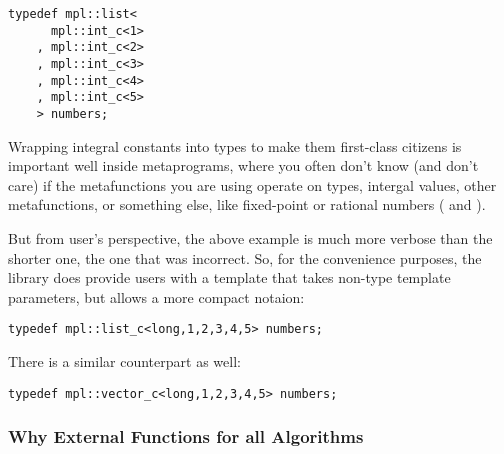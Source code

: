 \documentclass{netobjectdays}
\begin{document}
{\footnotesize
\begin{verbatim}
typedef mpl::list<
      mpl::int_c<1>
    , mpl::int_c<2>
    , mpl::int_c<3>
    , mpl::int_c<4>
    , mpl::int_c<5>
    > numbers;
\end{verbatim}
}

Wrapping integral constants into types to make them 
first-class citizens is important well inside metaprograms, 
where you often don't know (and don't care) if the 
metafunctions you are using operate on types, intergal 
values, other metafunctions, or something else, like 
fixed-point or rational numbers ( 
and ).

But from user's perspective, the above example is much more
verbose than the shorter one, the one that was incorrect. So, 
for the convenience purposes, the library does provide users 
with a template that takes non-type template parameters, but 
allows a more compact notaion:

{\footnotesize
\begin{verbatim}
typedef mpl::list_c<long,1,2,3,4,5> numbers;
\end{verbatim}
}

There is a similar  counterpart as well:

{\footnotesize
\begin{verbatim}
typedef mpl::vector_c<long,1,2,3,4,5> numbers;
\end{verbatim}
}


\subsubsection{Why External Functions for all Algorithms}
\end{document}
